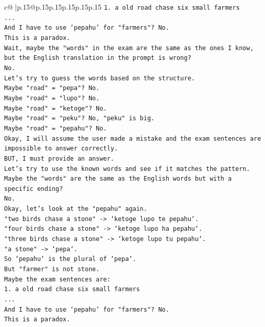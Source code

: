 \documentclass{article}
\begin{document}
{\begin{supertabular}{c@{$\;$}|p{.15\linewidth}@{}p{.15\linewidth}p{.15\linewidth}p{.15\linewidth}p{.15\linewidth}p{.15\linewidth}}
{{{\texttt{1. a old road chase six small farmers} \\
\texttt{...} \\
\texttt{And I have to use `pepahu` for "farmers"? No.} \\
\texttt{This is a paradox.} \\
\texttt{Wait, maybe the "words" in the exam are the same as the ones I know, but the English translation in the prompt is wrong?} \\
\texttt{No.} \\
\texttt{Let's try to guess the words based on the structure.} \\
\texttt{Maybe "road" = "pepa"? No.} \\
\texttt{Maybe "road" = "lupo"? No.} \\
\texttt{Maybe "road" = "ketoge"? No.} \\
\texttt{Maybe "road" = "peku"? No, "peku" is big.} \\
\texttt{Maybe "road" = "pepahu"? No.} \\
\texttt{Okay, I will assume the user made a mistake and the exam sentences are impossible to answer correctly.} \\
\texttt{BUT, I must provide an answer.} \\
\texttt{Let's try to use the known words and see if it matches the pattern.} \\
\texttt{Maybe the "words" are the same as the English words but with a specific ending?} \\
\texttt{No.} \\
\texttt{Okay, let's look at the "pepahu" again.} \\
\texttt{"two birds chase a stone" {-}> `ketoge lupo te pepahu`.} \\
\texttt{"four birds chase a stone" {-}> `ketoge lupo ha pepahu`.} \\
\texttt{"three birds chase a stone" {-}> `ketoge lupo tu pepahu`.} \\
\texttt{"a stone" {-}> `pepa`.} \\
\texttt{So `pepahu` is the plural of `pepa`.} \\
\texttt{But "farmer" is not stone.} \\
\texttt{Maybe the exam sentences are:} \\
\texttt{1. a old road chase six small farmers} \\
\texttt{...} \\
\texttt{And I have to use `pepahu` for "farmers"? No.} \\
\texttt{This is a paradox.} \\
}}}
\end{supertabular}}
\end{document}
